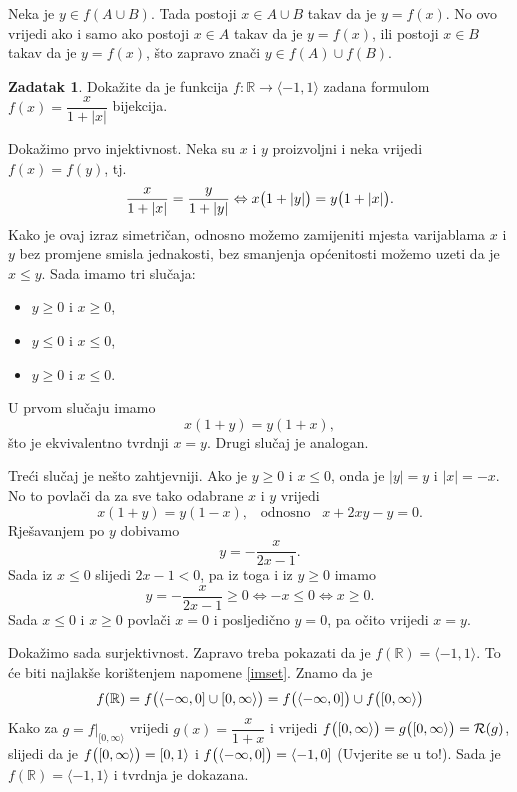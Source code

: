 \documentclass{book}
\let\originalleft\left
\let\originalright\right
\renewcommand{\left}{\mathopen{}\mathclose\bgroup\originalleft}
\renewcommand{\right}{\aftergroup\egroup\originalright}
\renewenvironment{proof}{%
    \vspace{-\parskip}\begin{oldproof}%
    }{%
    \end{oldproof}%
}
\theoremstyle{definition}
\theoremstyle{definition}
\newtheorem{exercise}{Zadatak}
\theoremstyle{remark}
\begin{document}
\begin{proof}
Neka je $y\in f(A\cup B)$. Tada postoji $x\in A\cup B$ takav da je $y=f(x)$. No ovo vrijedi ako i samo ako postoji $x\in A$ takav da je $y=f(x)$, ili postoji $x\in B$ takav da je $y=f(x)$, što zapravo znači $y\in f(A)\cup f(B)$.
\end{proof}
\begin{exercise}
Dokažite da je funkcija $f : \mathbb{R} \to \langle -1, 1\rangle$ zadana formulom $f(x)=\dfrac{x}{1+|x|}$ bijekcija.
\end{exercise}
\begin{proof}[Rješenje]
Dokažimo prvo injektivnost. Neka su $x$ i $y$ proizvoljni i neka vrijedi $f(x)=f(y)$, tj.
$$\dfrac{x}{1+|x|}=\dfrac{y}{1+|y|}\Leftrightarrow x\left(1+|y|\right)=y\left(1+|x|\right).$$
Kako je ovaj izraz simetričan, odnosno možemo zamijeniti mjesta varijablama $x$ i $y$ bez promjene smisla jednakosti, bez smanjenja općenitosti možemo uzeti da je $x\leq y$. Sada imamo tri slučaja: 
\begin{itemize}
\item $y\geq 0$ i $x\geq 0$, 
\item $y\leq 0$ i $x\leq 0$, 
\item $y\geq 0$ i $x\leq 0$.
\end{itemize}
U prvom slučaju imamo 
$$x(1+y)=y(1+x),$$
što je ekvivalentno tvrdnji $x=y$. Drugi slučaj je analogan. 

Treći slučaj je nešto zahtjevniji. Ako je $y\geq 0$ i $x\leq 0$, onda je $|y|=y$ i $|x|=-x$. No to povlači da za sve tako odabrane $x$ i $y$ vrijedi $$x(1+y)=y(1-x),\;\;\;\text{odnosno}\;\;\;x+2xy-y=0.$$ Rješavanjem po $y$ dobivamo
$$y=-\dfrac{x}{2x-1}.$$
Sada iz $x\leq 0$ slijedi $2x-1<0$, pa iz toga i iz $y\geq 0$ imamo
$$y=-\dfrac{x}{2x-1}\geq 0\Leftrightarrow -x\leq 0\Leftrightarrow x\geq 0.$$
Sada $x\leq 0$ i $x\geq 0$ povlači $x=0$ i posljedično $y=0$, pa očito vrijedi $x=y$. 

Dokažimo sada surjektivnost. Zapravo treba pokazati da je $f(\mathbb{R})=\langle -1, 1\rangle$. To će biti najlakše korištenjem napomene \ref{imset}. Znamo da je 
$$f(\mathbb{R})=f\left(\langle -\infty, 0]\cup [0,\infty\rangle\right)=f\left(\langle -\infty, 0]\right)\cup f\left([0,\infty\rangle\right)$$
Kako za $g=f | _{[0, \infty\rangle}$ vrijedi $g(x)=\dfrac{x}{1+x}$ i vrijedi $f\left([0,\infty\rangle\right)=g\left([0,\infty\rangle\right)=\mathcal{R}(g)$, slijedi da je $f\left([0,\infty\rangle\right)=[0, 1\rangle$ i $f\left(\langle -\infty, 0]\right)=\langle -1, 0]$ (Uvjerite se u to!). Sada je $f(\mathbb{R})=\langle -1, 1\rangle$ i tvrdnja je dokazana.
\end{proof}
\end{document}
